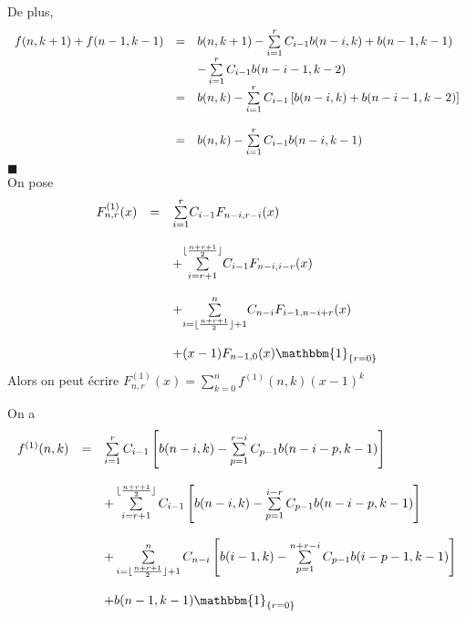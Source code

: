 De plus,
$$
	\begin{array}{l l l}
		f(n, k+1)+ f(n-1, k-1) & =       & b(n, k+1) -  \sum\limits_{i=1}^{r}C_{i-1}b(n-i, k) + b(n-1, k-1)              \\
		                       & \text{} & -  \sum\limits_{i=1}^{r}C_{i-1}b(n-i-1, k-2)                                  \\
		                       & =       & b(n, k) - \sum\limits_{i=1}^{r}C_{i-1}\left[ b(n-i, k) + b(n-i-1, k-2)\right] \\                               \\
		                       & =       & b(n, k) - \sum\limits_{i=1}^{r}C_{i-1}b(n-i, k-1)                             \\
	\end{array}
$$
$\blacksquare$
\text{} \vspace{5pt}\\
On pose $$
	\begin{array}{l l l}
		F^{(1)}_{n,r}(x) & =       & \underset{i=1}{\overset{r}{\sum}}C_{i-1}F_{n-i,r-i}(x)                                   \\ &\text{ }&\\
		                 & \text{} & +\underset{i=r+1}{\overset{\lfloor \frac{n+r+1}{2}\rfloor}{\sum}}C_{i-1}F_{n-i,i-r}(x)   \\ &\text{ }&\\
		                 & \text{} & +\underset{i=\lfloor \frac{n+r+1}{2}\rfloor+1}{\overset{n}{\sum}}C_{n-i}F_{i-1,n-i+r}(x) \\ &\text{ }&\\
		                 & \text{} & +(x-1)F_{n-1,0}(x)\mathbbm{1}_{\{r=0\}}
	\end{array}
$$
Alors on peut écrire $F^{(1)}_{n,r}(x) = \sum\limits_{k=0}^{n}f^{(1)}(n,k)(x-1)^{k}$
\begin{lemme} \label{l102}
	On a
	$$
		\begin{array}{l l l}
			f^{(1)}(n, k) & =        & \sum\limits_{i=1}^{r}C_{i-1}\left[ b(n-i, k) - \sum\limits_{p=1}^{r-i}C_{p-1}b(n-i-p, k-1) \right]                                      \\ &\text{ }&\\
			              & \text{ } & + \sum\limits_{i=r+1}^{\lfloor \frac{n+r+1}{2} \rfloor}C_{i-1}\left[ b(n-i, k) - \sum\limits_{p=1}^{i-r}C_{p-1}b(n-i-p, k-1) \right]    \\ &\text{ }&\\
			              & \text{ } & + \sum\limits_{i=\lfloor \frac{n+r+1}{2} \rfloor +1}^{n}C_{n-i}\left[ b(i-1, k) - \sum\limits_{p=1}^{n+r-i}C_{p-1}b(i-p-1, k-1) \right] \\ &\text{ }&\\
			              & \text{ } & +  b(n-1, k-1)\mathbbm{1}_{\{r=0\}}                                                                                                     \\
		\end{array}
	$$
\end{lemme}
